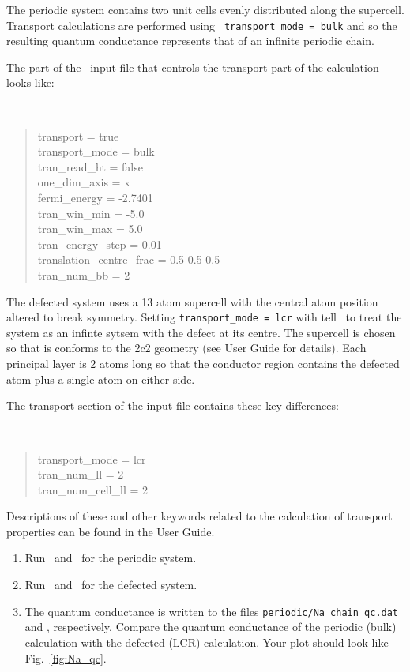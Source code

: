 \documentclass[a4paper,11pt,twoside]{article}
\begin{document}
The periodic system contains two unit cells evenly distributed along
the supercell. Transport calculations are performed using {\tt
  transport\_mode = bulk} and so the resulting quantum conductance
represents that of an infinite periodic chain.

The part of the \wannier\ input file that controls the transport part
of the calculation looks like:

{\tt
\begin{quote}
transport = true\\
transport\_mode = bulk\\
tran\_read\_ht = false\\
one\_dim\_axis = x\\
fermi\_energy = -2.7401\\
tran\_win\_min = -5.0\\
tran\_win\_max = 5.0\\
tran\_energy\_step = 0.01\\
translation\_centre\_frac = 0.5 0.5 0.5\\
tran\_num\_bb = 2

\end{quote} }

The defected system uses a 13 atom supercell with the central atom
position altered to break symmetry. Setting {\tt transport\_mode = lcr} with tell 
\wannier\ to treat the system as an infinte sytsem with the defect at its centre.
The supercell is chosen so that is conforms to the 2c2 geometry (see User Guide 
for details). Each principal layer is 2 atoms long so that the conductor 
region contains the defected atom plus a single atom on either side.

The transport section of the input file contains these key differences:

{\tt
\begin{quote}
transport\_mode = lcr\\
tran\_num\_ll = 2\\
tran\_num\_cell\_ll = 2\\

\end{quote} }

Descriptions of these and other keywords related to the calculation of
transport properties can be found in the User Guide.

\begin{enumerate}
\item Run \pwscf\ and \wannier\ for the periodic system.
\item Run \pwscf\ and \wannier\ for the defected system.
\item The quantum conductance is written to the files {\tt periodic/Na\_chain\_qc.dat} 
and , respectively. 
Compare the quantum conductance of the periodic (bulk) calculation with the
defected (LCR) calculation. Your plot should look like Fig.~\ref{fig:Na_qc}.
\end{enumerate}
\end{document}
